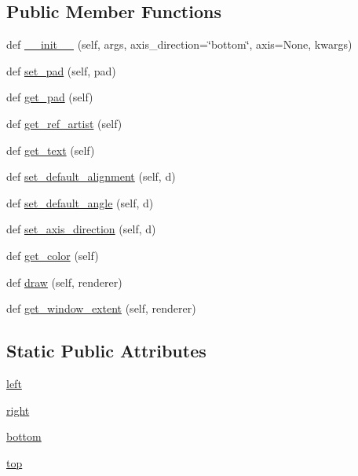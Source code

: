 \subsection*{Public Member Functions}
\begin{DoxyCompactItemize}
\item 
def \hyperlink{classaxisartist_1_1axis__artist_1_1AxisLabel_a3119889bf0fc09129220db340275dcb3}{\+\_\+\+\_\+init\+\_\+\+\_\+} (self, args, axis\+\_\+direction=\char`\"{}bottom\char`\"{}, axis=None, kwargs)
\item 
def \hyperlink{classaxisartist_1_1axis__artist_1_1AxisLabel_a89af27601d235bf3388eb26d5207fe47}{set\+\_\+pad} (self, pad)
\item 
def \hyperlink{classaxisartist_1_1axis__artist_1_1AxisLabel_a1463e6205ed21e00041dc61e152f53f1}{get\+\_\+pad} (self)
\item 
def \hyperlink{classaxisartist_1_1axis__artist_1_1AxisLabel_a1e6fc3906e8c16c8d8bd1ee0f81dcc28}{get\+\_\+ref\+\_\+artist} (self)
\item 
def \hyperlink{classaxisartist_1_1axis__artist_1_1AxisLabel_a03f813d0b95ecd4d174dd0c4545125ed}{get\+\_\+text} (self)
\item 
def \hyperlink{classaxisartist_1_1axis__artist_1_1AxisLabel_a9b01fbb991546b21517860fc78508963}{set\+\_\+default\+\_\+alignment} (self, d)
\item 
def \hyperlink{classaxisartist_1_1axis__artist_1_1AxisLabel_a83c16b209b775b60a05b39086fcf4901}{set\+\_\+default\+\_\+angle} (self, d)
\item 
def \hyperlink{classaxisartist_1_1axis__artist_1_1AxisLabel_a596fc237f415f34c98ec9ce801a7d436}{set\+\_\+axis\+\_\+direction} (self, d)
\item 
def \hyperlink{classaxisartist_1_1axis__artist_1_1AxisLabel_a60aa81e723d7f12dc2cecf9f9cf0f914}{get\+\_\+color} (self)
\item 
def \hyperlink{classaxisartist_1_1axis__artist_1_1AxisLabel_a59d2f5f47942900fa1c052c39ef29851}{draw} (self, renderer)
\item 
def \hyperlink{classaxisartist_1_1axis__artist_1_1AxisLabel_a595b32ba5263d3900e8f0ca936f768cf}{get\+\_\+window\+\_\+extent} (self, renderer)
\end{DoxyCompactItemize}
\subsection*{Static Public Attributes}
\begin{DoxyCompactItemize}
\item 
\hyperlink{classaxisartist_1_1axis__artist_1_1AxisLabel_ade57566d4e23ba24bb0a795bda6c5d11}{left}
\item 
\hyperlink{classaxisartist_1_1axis__artist_1_1AxisLabel_ac46fa0711cc35aa0610e9ea7ecc4fcb9}{right}
\item 
\hyperlink{classaxisartist_1_1axis__artist_1_1AxisLabel_a77113ebf196346c37d98e3cc4835a058}{bottom}
\item 
\hyperlink{classaxisartist_1_1axis__artist_1_1AxisLabel_a5dffd4c042d953a2d325b80e45ed0f33}{top}
\end{DoxyCompactItemize}
